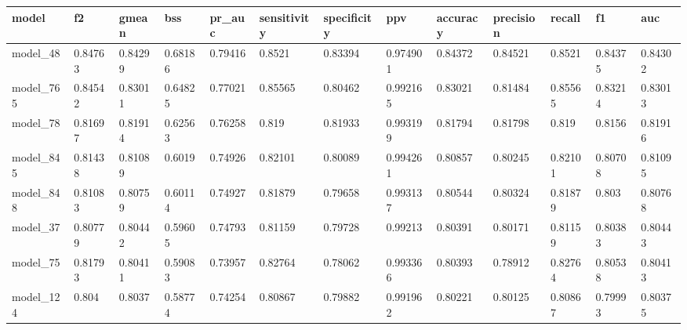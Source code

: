\begin{tabular}{|l|l|l|l|l|l|l|l|l|l|l|l|l|}
\hline
\textbf{model} & \textbf{f2} & \textbf{gmean} & \textbf{bss} & \textbf{pr\_auc} & \textbf{sensitivity} & \textbf{specificity} & \textbf{ppv} & \textbf{accuracy} & \textbf{precision} & \textbf{recall} & \textbf{f1} & \textbf{auc} \\ \hline
model\_48      & 0.84763     & 0.84299        & 0.68186      & 0.79416          & 0.8521               & 0.83394              & 0.974901     & 0.84372           & 0.84521            & 0.8521          & 0.84375     & 0.84302      \\ \hline
model\_765     & 0.84542     & 0.83011        & 0.64825      & 0.77021          & 0.85565              & 0.80462              & 0.992165     & 0.83021           & 0.81484            & 0.85565         & 0.83214     & 0.83013      \\ \hline
model\_78      & 0.81697     & 0.81914        & 0.62563      & 0.76258          & 0.819                & 0.81933              & 0.993199     & 0.81794           & 0.81798            & 0.819           & 0.8156      & 0.81916      \\ \hline
model\_845     & 0.81438     & 0.81089        & 0.6019       & 0.74926          & 0.82101              & 0.80089              & 0.994261     & 0.80857           & 0.80245            & 0.82101         & 0.80708     & 0.81095      \\ \hline
model\_848     & 0.81083     & 0.80759        & 0.60114      & 0.74927          & 0.81879              & 0.79658              & 0.993137     & 0.80544           & 0.80324            & 0.81879         & 0.803       & 0.80768      \\ \hline
model\_37      & 0.80779     & 0.80442        & 0.59605      & 0.74793          & 0.81159              & 0.79728              & 0.99213      & 0.80391           & 0.80171            & 0.81159         & 0.80383     & 0.80443      \\ \hline
model\_75      & 0.81793     & 0.80411        & 0.59083      & 0.73957          & 0.82764              & 0.78062              & 0.993366     & 0.80393           & 0.78912            & 0.82764         & 0.80538     & 0.80413      \\ \hline
model\_124     & 0.804       & 0.8037         & 0.58774      & 0.74254          & 0.80867              & 0.79882              & 0.991962     & 0.80221           & 0.80125            & 0.80867         & 0.79993     & 0.80375      \\ \hline

\end{tabular}

